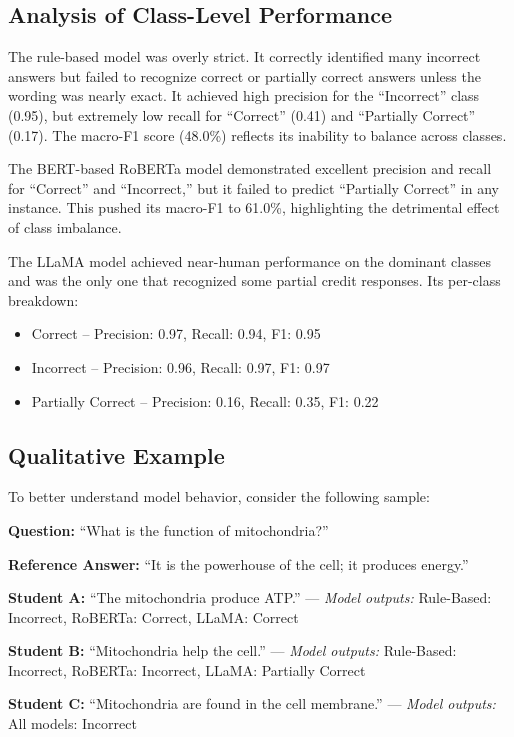\documentclass[11pt]{article}
\begin{document}
\subsection{Analysis of Class-Level Performance}
The rule-based model was overly strict. It correctly identified many incorrect answers but failed to recognize correct or partially correct answers unless the wording was nearly exact. It achieved high precision for the “Incorrect” class (0.95), but extremely low recall for “Correct” (0.41) and “Partially Correct” (0.17). The macro-F1 score (48.0\%) reflects its inability to balance across classes.

The BERT-based RoBERTa model demonstrated excellent precision and recall for “Correct” and “Incorrect,” but it failed to predict “Partially Correct” in any instance. This pushed its macro-F1 to 61.0\%, highlighting the detrimental effect of class imbalance.

The LLaMA model achieved near-human performance on the dominant classes and was the only one that recognized some partial credit responses. Its per-class breakdown:
\begin{itemize}
    \item Correct – Precision: 0.97, Recall: 0.94, F1: 0.95
    \item Incorrect – Precision: 0.96, Recall: 0.97, F1: 0.97
    \item Partially Correct – Precision: 0.16, Recall: 0.35, F1: 0.22
\end{itemize}

\subsection{Qualitative Example}
To better understand model behavior, consider the following sample:

\textbf{Question:} “What is the function of mitochondria?”

\textbf{Reference Answer:} “It is the powerhouse of the cell; it produces energy.”

\textbf{Student A:} “The mitochondria produce ATP.” — \textit{Model outputs:} Rule-Based: Incorrect, RoBERTa: Correct, LLaMA: Correct

\textbf{Student B:} “Mitochondria help the cell.” — \textit{Model outputs:} Rule-Based: Incorrect, RoBERTa: Incorrect, LLaMA: Partially Correct

\textbf{Student C:} “Mitochondria are found in the cell membrane.” — \textit{Model outputs:} All models: Incorrect
\end{document}
